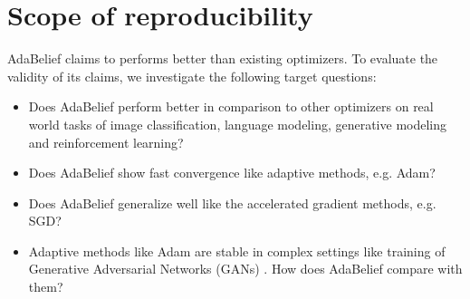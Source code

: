\section{Scope of reproducibility}
\label{sec:claims}



AdaBelief \cite{zhuang_adabelief_2020} claims to performs better than existing optimizers. To evaluate the  validity of its claims, we investigate the following target questions:

\begin{itemize}
    \item Does AdaBelief perform better in comparison to other optimizers on real world tasks of image classification, language modeling, generative modeling and reinforcement learning?
    \item Does AdaBelief show fast convergence like adaptive methods, e.g. Adam?
    \item Does AdaBelief generalize well like the accelerated gradient methods, e.g. SGD?
    \item Adaptive methods like Adam are stable in complex settings like training of Generative Adversarial Networks (GANs) \cite{GAN}. How does AdaBelief compare with them?
\end{itemize}

